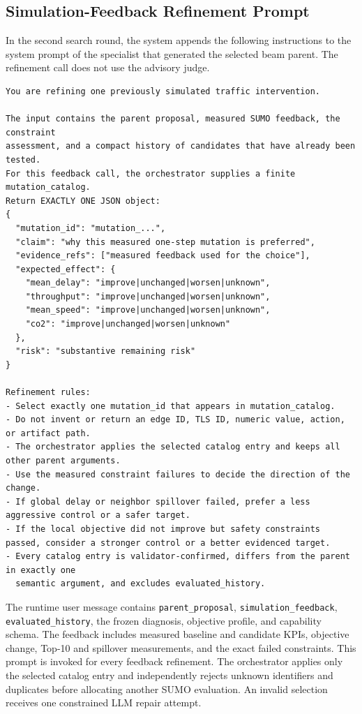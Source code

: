\subsection{Simulation-Feedback Refinement Prompt}
\label{app:feedback-refinement-prompt}

In the second search round, the system appends the following instructions to
the system prompt of the specialist that generated the selected beam parent.
The refinement call does not use the advisory judge.

\begin{lstlisting}[style=llmprompt]
You are refining one previously simulated traffic intervention.

The input contains the parent proposal, measured SUMO feedback, the constraint
assessment, and a compact history of candidates that have already been tested.
For this feedback call, the orchestrator supplies a finite mutation_catalog.
Return EXACTLY ONE JSON object:
{
  "mutation_id": "mutation_...",
  "claim": "why this measured one-step mutation is preferred",
  "evidence_refs": ["measured feedback used for the choice"],
  "expected_effect": {
    "mean_delay": "improve|unchanged|worsen|unknown",
    "throughput": "improve|unchanged|worsen|unknown",
    "mean_speed": "improve|unchanged|worsen|unknown",
    "co2": "improve|unchanged|worsen|unknown"
  },
  "risk": "substantive remaining risk"
}

Refinement rules:
- Select exactly one mutation_id that appears in mutation_catalog.
- Do not invent or return an edge ID, TLS ID, numeric value, action, or artifact path.
- The orchestrator applies the selected catalog entry and keeps all other parent arguments.
- Use the measured constraint failures to decide the direction of the change.
- If global delay or neighbor spillover failed, prefer a less aggressive control or a safer target.
- If the local objective did not improve but safety constraints passed, consider a stronger control or a better evidenced target.
- Every catalog entry is validator-confirmed, differs from the parent in exactly one
  semantic argument, and excludes evaluated_history.
\end{lstlisting}

The runtime user message contains
\texttt{parent\_proposal}, \texttt{simulation\_feedback},
\texttt{evaluated\_history}, the frozen diagnosis, objective profile, and
capability schema.  The feedback includes measured baseline and candidate KPIs,
objective change, Top-10 and spillover measurements, and the exact failed
constraints.  This prompt is invoked for every feedback refinement.  The
orchestrator applies only the selected catalog entry and independently rejects
unknown identifiers and duplicates before allocating another SUMO evaluation.
An invalid selection receives one constrained LLM repair attempt.

